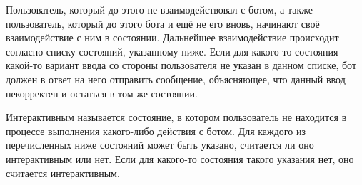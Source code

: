         Пользователь, который до этого не взаимодействовал с ботом, а также пользователь, который
        до этого  бота и ещё не  его вновь, начинают
        своё взаимодействие с ним в \hyperref[itm:req:ui:states:init]{} состоянии.
        Дальнейшее взаимодействие происходит согласно списку состояний, указанному ниже.
        Если для какого-то состояния какой-то вариант ввода со стороны пользователя не указан в данном
        списке, бот должен в ответ на него отправить сообщение, объясняющее, что данный
        ввод некорректен и остаться в том же состоянии.

        Интерактивным называется состояние, в котором пользователь не находится в процессе выполнения
        какого-либо действия с ботом. Для каждого из перечисленных ниже состояний может быть указано,
        считается ли оно интерактивным или нет. Если для какого-то состояния такого указания нет,
        оно считается интерактивным.
